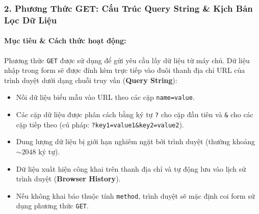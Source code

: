 \documentclass[11pt,oneside]{book}
\newcommand{\codeinline}[1]{\textcolor{accentOrange}{\texttt{#1}}}
\newcommand{\term}[1]{\textbf{\textcolor{primaryBlue}{#1}}}
\begin{document}
\subsubsection{2. Phương Thức GET: Cấu Trúc Query String \& Kịch Bản Lọc Dữ Liệu}

\paragraph{Mục tiêu \& Cách thức hoạt động:}
Phương thức \codeinline{GET} được sử dụng để gửi yêu cầu lấy dữ liệu từ máy chủ. Dữ liệu nhập trong form sẽ được đính kèm trực tiếp vào đuôi thanh địa chỉ URL của trình duyệt dưới dạng chuỗi truy vấn (\term{Query String}):
\begin{itemize}[leftmargin=1.8em, itemsep=3pt, parsep=0pt]
    \item Nối dữ liệu biểu mẫu vào URL theo các cặp \codeinline{name=value}.
    \item Các cặp dữ liệu được phân cách bằng ký tự \codeinline{?} cho cặp đầu tiên và \codeinline{\&} cho các cặp tiếp theo (cú pháp: \codeinline{?key1=value1\&key2=value2}).
    \item Dung lượng dữ liệu bị giới hạn nghiêm ngặt bởi trình duyệt (thường khoảng $\sim 2048$ ký tự).
    \item Dữ liệu xuất hiện công khai trên thanh địa chỉ và tự động lưu vào lịch sử trình duyệt (\term{Browser History}).
    \item Nếu không khai báo thuộc tính \codeinline{method}, trình duyệt sẽ mặc định coi form sử dụng phương thức \codeinline{GET}.
\end{itemize}
\end{document}
